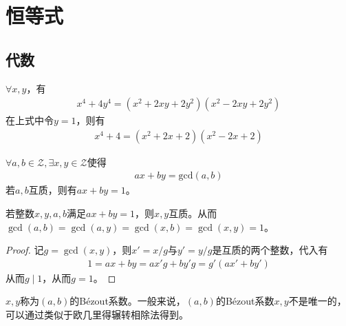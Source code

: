
\chapter{恒等式}
\label{chap:identities}

\section{代数}
\label{sec:algebra-identities}

\begin{theorem}
  $\forall x,y$，有
  \begin{align*}
    x^4 + 4y^4 = (x^2 + 2xy + 2y^2)(x^2 - 2xy + 2y^2)
  \end{align*}
  在上式中令$y=1$，则有
  \begin{align*}
    x^4 + 4 = (x^2 + 2x + 2)(x^2 - 2x + 2)
  \end{align*}
\end{theorem}

\begin{theorem}\label{th:Bezout}
  $\forall a,b\in\mathcal{Z},\exists x,y\in\mathcal{Z}$使得
  \begin{align*}
    ax+by=\mathrm{gcd}(a,b)
  \end{align*}
  若$a,b$互质，则有$ax+by=1$。
\end{theorem}

\begin{theorem}\label{th:inverse-bezout}
  若整数$x,y,a,b$满足$ax+by=1$，则$x,y$互质。从而$\gcd(a,b)=\gcd(a,y)=\gcd(x,b)=\gcd(x,y)=1$。
\end{theorem}
\begin{proof}
  记$g=\gcd(x,y)$，则$x'=x/g$与$y'=y/g$是互质的两个整数，代入有
  \begin{align*}
    1=ax+by=ax'g+by'g=g'(ax'+by')
  \end{align*}
  从而$g\mid 1$，从而$g=1$。
\end{proof}

$x,y$称为$(a,b)$的B\'ezout系数。一般来说，$(a,b)$的B\'ezout系数$x,y$不是唯一的，可以通过类似于欧几里得辗转相除法得到。

